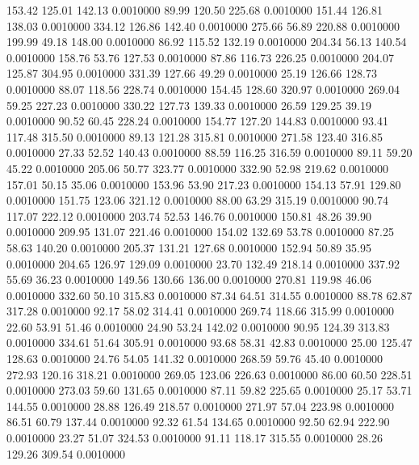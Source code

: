  153.42  125.01  142.13   0.0010000
  89.99  120.50  225.68   0.0010000
 151.44  126.81  138.03   0.0010000
 334.12  126.86  142.40   0.0010000
 275.66   56.89  220.88   0.0010000
 199.99   49.18  148.00   0.0010000
  86.92  115.52  132.19   0.0010000
 204.34   56.13  140.54   0.0010000
 158.76   53.76  127.53   0.0010000
  87.86  116.73  226.25   0.0010000
 204.07  125.87  304.95   0.0010000
 331.39  127.66   49.29   0.0010000
  25.19  126.66  128.73   0.0010000
  88.07  118.56  228.74   0.0010000
 154.45  128.60  320.97   0.0010000
 269.04   59.25  227.23   0.0010000
 330.22  127.73  139.33   0.0010000
  26.59  129.25   39.19   0.0010000
  90.52   60.45  228.24   0.0010000
 154.77  127.20  144.83   0.0010000
  93.41  117.48  315.50   0.0010000
  89.13  121.28  315.81   0.0010000
 271.58  123.40  316.85   0.0010000
  27.33   52.52  140.43   0.0010000
  88.59  116.25  316.59   0.0010000
  89.11   59.20   45.22   0.0010000
 205.06   50.77  323.77   0.0010000
 332.90   52.98  219.62   0.0010000
 157.01   50.15   35.06   0.0010000
 153.96   53.90  217.23   0.0010000
 154.13   57.91  129.80   0.0010000
 151.75  123.06  321.12   0.0010000
  88.00   63.29  315.19   0.0010000
  90.74  117.07  222.12   0.0010000
 203.74   52.53  146.76   0.0010000
 150.81   48.26   39.90   0.0010000
 209.95  131.07  221.46   0.0010000
 154.02  132.69   53.78   0.0010000
  87.25   58.63  140.20   0.0010000
 205.37  131.21  127.68   0.0010000
 152.94   50.89   35.95   0.0010000
 204.65  126.97  129.09   0.0010000
  23.70  132.49  218.14   0.0010000
 337.92   55.69   36.23   0.0010000
 149.56  130.66  136.00   0.0010000
 270.81  119.98   46.06   0.0010000
 332.60   50.10  315.83   0.0010000
  87.34   64.51  314.55   0.0010000
  88.78   62.87  317.28   0.0010000
  92.17   58.02  314.41   0.0010000
 269.74  118.66  315.99   0.0010000
  22.60   53.91   51.46   0.0010000
  24.90   53.24  142.02   0.0010000
  90.95  124.39  313.83   0.0010000
 334.61   51.64  305.91   0.0010000
  93.68   58.31   42.83   0.0010000
  25.00  125.47  128.63   0.0010000
  24.76   54.05  141.32   0.0010000
 268.59   59.76   45.40   0.0010000
 272.93  120.16  318.21   0.0010000
 269.05  123.06  226.63   0.0010000
  86.00   60.50  228.51   0.0010000
 273.03   59.60  131.65   0.0010000
  87.11   59.82  225.65   0.0010000
  25.17   53.71  144.55   0.0010000
  28.88  126.49  218.57   0.0010000
 271.97   57.04  223.98   0.0010000
  86.51   60.79  137.44   0.0010000
  92.32   61.54  134.65   0.0010000
  92.50   62.94  222.90   0.0010000
  23.27   51.07  324.53   0.0010000
  91.11  118.17  315.55   0.0010000
  28.26  129.26  309.54   0.0010000
